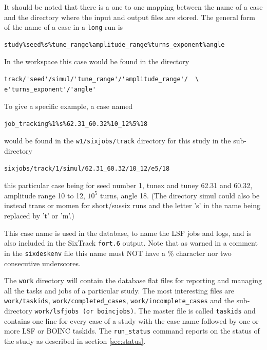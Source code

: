 \documentclass{article}    %
\begin{document}
It should be noted that there is a one to one mapping between the name of a case
and the directory where the input and output files are stored. The general form of
the name of a case in a {\tt long} run is 
\begin{verbatim}
study%seed%s%tune_range%amplitude_range%turns_exponent%angle
\end{verbatim}
In the workspace this case would be found in the directory
\begin{verbatim}
track/'seed'/simul/'tune_range'/'amplitude_range'/  \
e'turns_exponent'/'angle'
\end{verbatim}
To give a specific example, a case named
\begin{verbatim}
job_tracking%1%s%62.31_60.32%10_12%5%18
\end{verbatim} would be found in the {\tt w1/sixjobs/track} directory for 
this study in the sub-directory
\begin{verbatim}
sixjobs/track/1/simul/62.31_60.32/10_12/e5/18
\end{verbatim}
this particular case being for seed number 1, tunex and tuney 62.31 and 60.32,
amplitude range 10 to 12, $10^5$ turns, angle 18. (The directory simul could also
be instead trans or momen for short/sussix runs and the letter 's' in the
name being replaced by 't' or 'm'.)
 
This case name is used in the database, to name the LSF jobs and logs, and is
also included in the SixTrack {\tt fort.6} output. Note that as warned in a
comment in the {\tt sixdeskenv} file this name must
NOT have a \% character nor two consecutive underscores.

The {\tt work} directory will contain the database flat files for reporting
and managing all the tasks and jobs of a particular study.
The most interesting files are {\tt work/taskids}, {\tt work/completed\_cases},
{\tt work/incomplete\_cases} and the sub-directory {\tt work/lsfjobs (or boincjobs)}.
The master file is called {\tt taskids} and contains one line for every case of
a study with the case name followed by one or more LSF or BOINC taskids. The {\tt run\_status}
command reports on the status of the study as described in section \ref{sec:status}.
\end{document}

